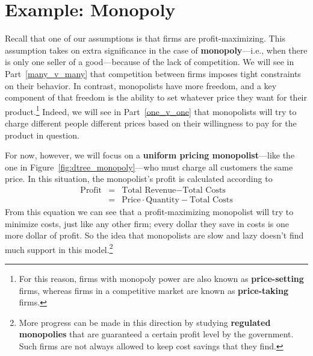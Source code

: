 \section{Example: Monopoly}

Recall that one of our assumptions is that firms are profit-maximizing. This assumption takes on extra significance in the case of \textbf{monopoly}---i.e., when there is only one seller of a good---because of the lack of competition. We will see in Part~\ref{many_v_many} that competition between firms imposes tight constraints on their behavior. In contrast, monopolists have more freedom, and a key component of that freedom is the ability to set whatever price they want for their product.\footnote{For this reason, firms with monopoly power are also known as \textbf{price-setting} firms, whereas firms in a competitive market are known as \textbf{price-taking} firms.} Indeed, we will see in Part~\ref{one_v_one} that monopolists will try to charge different people different prices based on their willingness to pay for the product in question.

For now, however, we will focus on a \textbf{uniform pricing monopolist}---like the one in Figure~\ref{fig:dtree_monopoly}---who must charge all customers the same price. In this situation, the monopolist's profit is calculated according to
\begin{eqnarray*}
\mbox{Profit} & = & \mbox{Total Revenue} - \mbox{Total Costs} \\
& = & \mbox{Price} \cdot \mbox{Quantity} - \mbox{Total Costs}
\end{eqnarray*}
From this equation we can see that a profit-maximizing monopolist will try to minimize costs, just like any other firm; every dollar they save in costs is one more dollar of profit. So the idea that monopolists are slow and lazy doesn't find much support in this model.\footnote{More progress can be made in this direction by studying \textbf{regulated monopolies} that are guaranteed a certain profit level by the government. Such firms are not always allowed to keep cost savings that they find.}%

